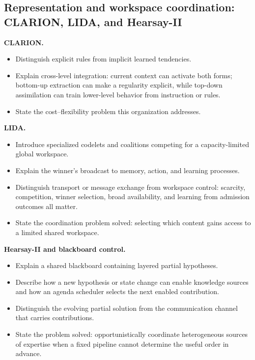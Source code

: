 \subsection{Representation and workspace coordination: CLARION, LIDA, and Hearsay-II}
\textbf{CLARION.}
\begin{itemize}
  \item Distinguish explicit rules from implicit learned tendencies.
  \item Explain cross-level integration: current context can activate both forms; bottom-up extraction can make a regularity explicit, while top-down assimilation can train lower-level behavior from instruction or rules.
  \item State the cost--flexibility problem this organization addresses.
\end{itemize}
\textbf{LIDA.}
\begin{itemize}
  \item Introduce specialized codelets and coalitions competing for a capacity-limited global workspace.
  \item Explain the winner's broadcast to memory, action, and learning processes.
  \item Distinguish transport or message exchange from workspace control: scarcity, competition, winner selection, broad availability, and learning from admission outcomes all matter.
  \item State the coordination problem solved: selecting which content gains access to a limited shared workspace.
\end{itemize}
\textbf{Hearsay-II and blackboard control.}
\begin{itemize}
  \item Explain a shared blackboard containing layered partial hypotheses.
  \item Describe how a new hypothesis or state change can enable knowledge sources and how an agenda scheduler selects the next enabled contribution.
  \item Distinguish the evolving partial solution from the communication channel that carries contributions.
  \item State the problem solved: opportunistically coordinate heterogeneous sources of expertise when a fixed pipeline cannot determine the useful order in advance.
\end{itemize}

